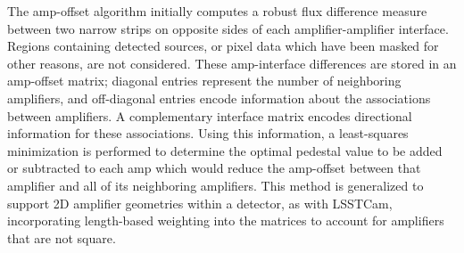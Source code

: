 The amp-offset algorithm initially computes a robust flux difference measure between two narrow strips on opposite sides of each amplifier-amplifier interface.
Regions containing detected sources, or pixel data which have been masked for other reasons, are not considered.
These amp-interface differences are stored in an amp-offset matrix; diagonal entries represent the number of neighboring amplifiers, and off-diagonal entries encode information about the associations between amplifiers.
A complementary interface matrix encodes directional information for these associations.
Using this information, a least-squares minimization is performed to determine the optimal pedestal value to be added or subtracted to each amp which would reduce the amp-offset between that amplifier and all of its neighboring amplifiers.
This method is generalized to support 2D amplifier geometries within a detector, as with LSSTCam, incorporating length-based weighting into the matrices to account for amplifiers that are not square.

